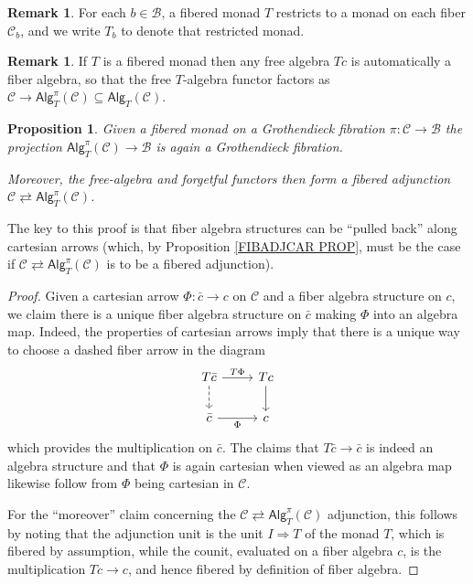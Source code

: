 \documentclass[a4paper,10pt
,draft
]{article}%
\numberwithin{equation}{section}
\numberwithin{figure}{section}
\newtheorem{proposition}[equation]{Proposition}%
\theoremstyle{definition} %
\newtheorem{remark}[equation]{Remark}%
\newcommand{\1}{\ensuremath{\mathbbm 1}}%
\begin{document}
\begin{remark}
For each $b\in \mathcal{B}$, a fibered monad $T$ restricts to a monad on each fiber $\mathcal{C}_b$, and we write $T_b$ to denote that restricted monad.
\end{remark}


\begin{remark}
If $T$ is a fibered monad then any free algebra $Tc$ is automatically a fiber algebra, so that the free $T$-algebra functor factors
as 
$\mathcal{C} \to \mathsf{Alg}^{\pi}_T(\mathcal{C}) \subseteq \mathsf{Alg}_T(\mathcal{C})$.
\end{remark}



\begin{proposition}\label{FIBALGGR PROP}
Given a fibered monad on a Grothendieck fibration $\pi \colon \mathcal{C} \to \mathcal{B}$
the projection $\mathsf{Alg}^{\pi}_T(\mathcal{C}) \to \mathcal{B}$
is again a Grothendieck fibration.

Moreover, the free-algebra and forgetful functors then form a fibered adjunction
$\mathcal{C} \rightleftarrows \mathsf{Alg}^{\pi}_T(\mathcal{C})$.
\end{proposition}


The key to this proof is that fiber algebra structures can be ``pulled back'' along cartesian arrows
(which, by Proposition \ref{FIBADJCAR PROP}, must be the case if $\mathcal{C} \rightleftarrows \mathsf{Alg}^{\pi}_T(\mathcal{C})$ is to be a fibered adjunction). 



\begin{proof}
Given a cartesian arrow $\Phi \colon \bar{c} \to c$ on $\mathcal{C}$ and a fiber algebra structure on $c$, we claim there is a unique fiber algebra structure on $\bar{c}$ making $\Phi$ into an algebra map. Indeed, the properties of cartesian arrows imply that there is a unique way to choose a dashed fiber arrow in the diagram
\[
\begin{tikzcd}
	T \bar{c} \ar{r}{T \Phi} \ar[dashed]{d} & T c \ar{d}
\\
	\bar{c} \ar{r}[swap]{\Phi} & c
\end{tikzcd}
\]
which provides the multiplication on $\bar{c}$.
The claims that $T\bar{c} \to \bar{c}$ is indeed an algebra structure and that 
$\Phi$ is again cartesian when viewed as an algebra map likewise follow from 
$\Phi$ being cartesian in $\mathcal{C}$.

For the ``moreover'' claim concerning the 
$\mathcal{C} \rightleftarrows \mathsf{Alg}^{\pi}_T(\mathcal{C})$
adjunction,
this follows by noting that the adjunction unit is the unit
$I \Rightarrow T$ of the monad $T$, 
which is fibered by assumption,
while the counit, evaluated on a fiber algebra $c$, is the multiplication $Tc \to c$, and hence fibered by definition of fiber algebra.
\end{proof}
\end{document}
